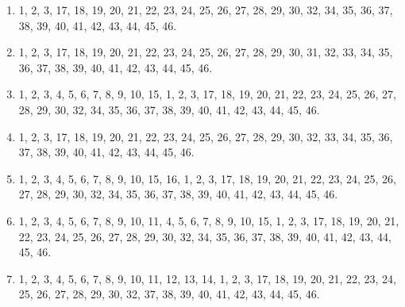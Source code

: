 \documentclass{book}
\begin{document}
\begin{enumerate}
	\item 1, 2, 3, 17, 18, 19, 20, 21, 22, 23, 24, 25, 26, 27, 28, 29, 30, 32, 34, 35, 36, 37, 38, 39, 40, 41, 42, 43, 44, 45, 46.
	\item 1, 2, 3, 17, 18, 19, 20, 21, 22, 23, 24, 25, 26, 27, 28, 29, 30, 31, 32, 33, 34, 35, 36, 37, 38, 39, 40, 41, 42, 43, 44, 45, 46.
	\item 1, 2, 3, 4, 5, 6, 7, 8, 9, 10, 15, 1, 2, 3, 17, 18, 19, 20, 21, 22, 23, 24, 25, 26, 27, 28, 29, 30, 32, 34, 35, 36, 37, 38, 39, 40, 41, 42, 43, 44, 45, 46.
	\item 1, 2, 3, 17, 18, 19, 20, 21, 22, 23, 24, 25, 26, 27, 28, 29, 30, 32, 33, 34, 35, 36, 37, 38, 39, 40, 41, 42, 43, 44, 45, 46.
	\item 1, 2, 3, 4, 5, 6, 7, 8, 9, 10, 15, 16, 1, 2, 3, 17, 18, 19, 20, 21, 22, 23, 24, 25, 26, 27, 28, 29, 30, 32, 34, 35, 36, 37, 38, 39, 40, 41, 42, 43, 44, 45, 46.
	\item 1, 2, 3, 4, 5, 6, 7, 8, 9, 10, 11, 4, 5, 6, 7, 8, 9, 10, 15, 1, 2, 3, 17, 18, 19, 20, 21, 22, 23, 24, 25, 26, 27, 28, 29, 30, 32, 34, 35, 36, 37, 38, 39, 40, 41, 42, 43, 44, 45, 46.
	\item 1, 2, 3, 4, 5, 6, 7, 8, 9, 10, 11, 12, 13, 14, 1, 2, 3, 17, 18, 19, 20, 21, 22, 23, 24, 25, 26, 27, 28, 29, 30, 32, 37, 38, 39, 40, 41, 42, 43, 44, 45, 46.
	
	
\end{enumerate}
\end{document}
